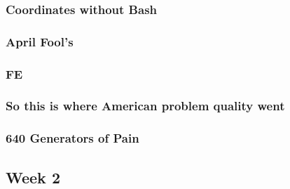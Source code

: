 \documentclass[titlepage=true]{scrartcl}
\begin{document}
    \subsubsection{Coordinates without Bash}
	\label{12.1.3}
	
	\newpage

    \subsubsection{April Fool's}
	\label{12.1.4}
	
	\newpage
	
	\subsubsection{FE}
	\label{12.1.5}
	
	\newpage

	\subsubsection{So this is where American problem quality went}
	\label{12.1.6}
	
	\newpage

	\subsubsection{640 Generators of Pain}
	\label{12.1.7}
	
	\newpage

    \subsection{Week 2}
\end{document}
